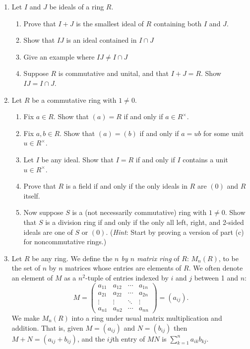 \documentclass[11pt]{article}
\begin{document}
\begin{enumerate}
{  }
  \item{
  Let $I$ and $J$ be ideals of a ring $R$.
  \begin{enumerate}
    \item{Prove that $I+J$ is the smallest ideal of $R$ containing both $I$ and $J$.}
    \item{Show that $IJ$ is an ideal contained in $I\cap J$}
    \item{Give an example where $IJ\not=I\cap J$}
    \item{Suppose $R$ is commutative and unital, and that $I+J=R$.  Show $IJ=I\cap J$.}
  \end{enumerate}
  }
  \item{
  Let $R$ be a commutative ring with $1\not=0$.
  \begin{enumerate}
    \item{
    Fix $a\in R$.  Show that $(a)=R$ if and only if $a\in R^\times$.
    }
    \item{
    Fix $a,b\in R$.  Show that $(a)=(b)$ if and only if $a = ub$ for some unit $u\in R^\times$.
    }
    \item{
    Let $I$ be any ideal.  Show that $I=R$ if and only if $I$ contains a unit $u\in R^\times$.
    }
    \item{
    Prove that $R$ is a field if and only if the only ideals in $R$ are $(0)$ and $R$ itself.
    }
    \item{
    Now suppose $S$ is a (not necessarily commutative) ring with $1\not=0$.  Show that $S$ is a division ring if and only if the only all left, right, and 2-sided ideals are one of $S$ or $(0)$.  (\textit{Hint}: Start by proving a version of part (c) for noncommutative rings.)
    }
  \end{enumerate}
  }
  \item{
  Let $R$ be any ring.  We define the \textit{$n$ by $n$ matrix ring} of $R$: $M_n(R)$, to be the set of $n$ by $n$ matrices whose entries are elements of $R$.  We often denote an element of $M$ as a $n^2$-tuple of entries indexed by $i$ and $j$ between 1 and $n$:
  \[M =
  \begin{pmatrix}
    a_{11} & a_{12} & \cdots & a_{1n}\\
    a_{21} & a_{22} & \cdots & a_{2n}\\
    \vdots & \vdots & \ddots & \vdots\\
    a_{n1} & a_{n2} & \cdots & a_{nn}
  \end{pmatrix}
  = (a_{ij}).
  \]
  We make $M_n(R)$ into a ring under usual matrix multiplication and addition.  That is, given $M = (a_{ij})$ and $N=(b_{ij})$ then $M+N=(a_{ij}+b_{ij})$, and the $ij$th entry of $MN$ is $\sum_{k=1}^na_{ik}b_{kj}$.
}
\end{enumerate}
\end{document}
